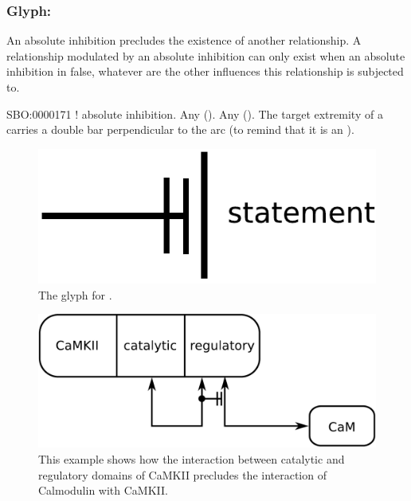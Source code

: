 \color{ForestGreen}

\subsubsection{Glyph: }\label{sec:absoluteInhibition}

An absolute inhibition precludes the existence of another relationship. A relationship modulated by an absolute inhibition can only exist when an absolute inhibition in false, whatever are the other influences this relationship is subjected to.

\begin{glyphDescription}
 \glyphSboTerm SBO:0000171 ! absolute inhibition.
 \glyphOrigin Any  ().
 \glyphTarget Any  ().
 \glyphEndPoint The target extremity of a  carries a double bar perpendicular to the arc (to remind that it is an ).
 \end{glyphDescription}

\begin{figure}[H]
  \centering
  \includegraphics[scale = 0.3]{images/absoluteInhibition}
  \caption{The \PD glyph for .}
  \label{fig:absoluteInhibition}
\end{figure}

\begin{figure}[H]
  \centering
  \includegraphics[scale = 0.5]{examples/ex-absoluteInhibition}
  \caption{This example shows how the interaction between catalytic and regulatory domains of CaMKII precludes the interaction of Calmodulin with CaMKII.}
  \label{fig:ex-absoluteInhibition}
\end{figure}

\normalcolor